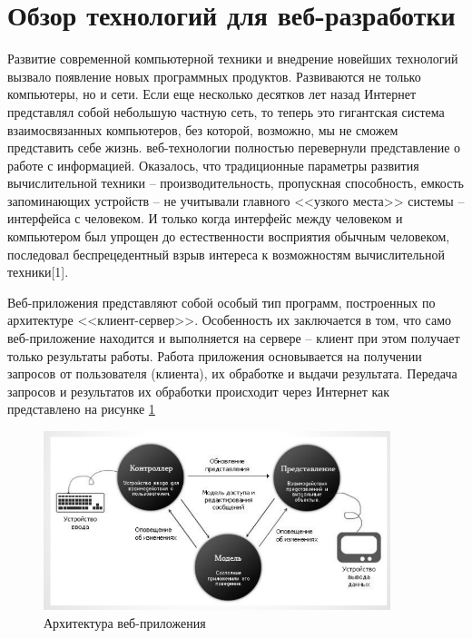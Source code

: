 \section{Обзор технологий для веб-разработки}

Развитие современной компьютерной техники и внедрение новейших технологий вызвало появление новых программных продуктов. 
Развиваются не только компьютеры, но и сети. Если еще несколько десятков лет назад Интернет представлял собой небольшую частную сеть, то теперь это гигантская система взаимосвязанных компьютеров, без которой, возможно, мы не сможем представить себе жизнь.
веб-технологии полностью перевернули представление о работе с информацией. Оказалось, что традиционные параметры развития вычислительной техники -- производительность, пропускная способность, емкость запоминающих устройств -- не учитывали главного <<узкого места>> системы -- интерфейса с человеком. И только когда интерфейс между человеком и компьютером был упрощен до естественности восприятия обычным человеком, последовал беспрецедентный взрыв интереса к возможностям вычислительной техники[1].

Веб-приложения представляют собой особый тип программ, построенных по архитектуре <<клиент-сервер>>. Особенность их заключается в том, что само веб-приложение находится и выполняется на сервере -- клиент при этом получает только результаты работы. Работа приложения основывается на получении запросов от пользователя (клиента), их обработке и выдачи результата. Передача запросов и результатов их обработки происходит через Интернет как представлено на рисунке \ref{web}

\begin{figure}[ht]
\center\includegraphics[width=0.9\textwidth]{mvc}
\caption{Архитектура веб-приложения}\label{web}
\end{figure}

